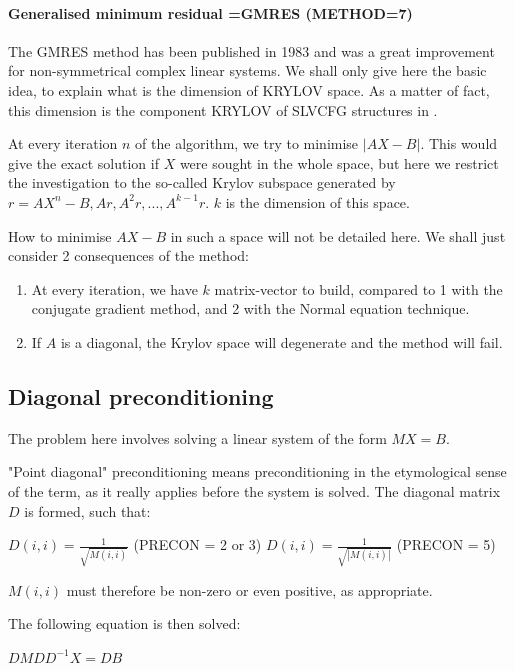 \paragraph{Generalised minimum residual =GMRES (METHOD=7)}

The GMRES method has been published in 1983 and was a great improvement for
non-symmetrical complex linear systems. We shall only give here the basic idea,
to explain what is the dimension of KRYLOV space. As a matter of fact, this
dimension is the component KRYLOV of SLVCFG structures in \bief.

At every iteration $n$ of the algorithm, we try to minimise $\left|AX-B\right|$.
This would give the exact solution if $X$ were sought in the whole space, but
here we restrict the investigation to the so-called Krylov subspace generated
by $r = AX^{n} - B, Ar, A^{2}r, ..., A^{k-1}r$.
$k$ is the dimension of this space.

How to minimise $AX-B$ in such a space will not be detailed here. We shall just
consider 2 consequences of the method:

\begin{enumerate}
  \item At every iteration, we have $k$ matrix-vector to build, compared to 1
    with the conjugate gradient method, and 2 with the Normal
    equation technique.
  \item If $A$ is a diagonal, the Krylov space will degenerate and the method
    will fail.
\end{enumerate}

\subsection{Diagonal preconditioning}

The problem here involves solving a linear system of the form $MX = B$.

"Point diagonal" preconditioning means preconditioning in the etymological
sense of the term, as it really applies before the system is solved. The
diagonal matrix $D$ is formed, such that:

$D(i,i)=\frac{1}{\sqrt{M(i,i)} } $ (PRECON = 2 or 3)
$D(i,i)=\frac{1}{\sqrt{\left|M(i,i)\right|} } $   (PRECON = 5)

$M(i,i)$ must therefore be non-zero or even positive, as appropriate.

The following equation is then solved:

$DMDD^{-1}X  =  DB$

